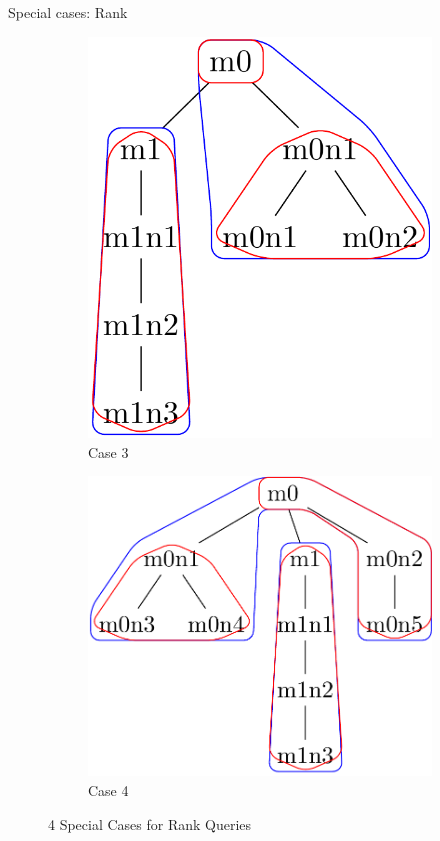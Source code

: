 \documentclass{beamer}
\begin{document}
\begin{frame}{Special cases: Rank}
\begin{figure}[ht]
\begin{subfigure}{2cm}
	\end{subfigure}
	\begin{subfigure}{3cm}
		\includegraphics[scale=0.2]{F4C3Tree}
		\caption{Case 3}
		\label{rank:subim3}
	\end{subfigure}
	\begin{subfigure}{3cm}
		\includegraphics[scale=0.2]{F4C4Tree}
		\caption{Case 4}
		\label{rank:subim4}
	\end{subfigure}

	\caption{4 Special Cases for Rank Queries}
	\label{rank:images4}
	\end{figure}
\end{frame}
\end{document}
